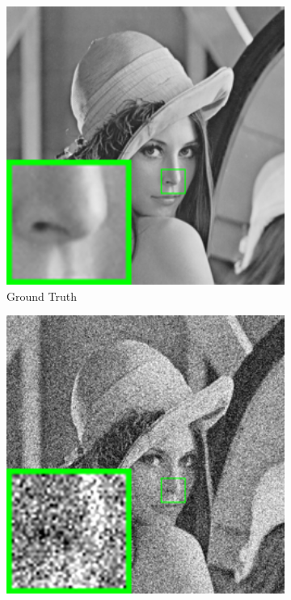 \begin{figure}
\begin{adjustwidth}{-2cm}{}
    \centering
    \begin{subfigure}[t]{0.19\textwidth}
        \centering
        \includegraphics[width=1\textwidth]{images/twsc/awgn/resize_br_lena.png}
	   \caption{Ground Truth}
    \end{subfigure}
    \hfill
    \begin{subfigure}[t]{0.19\textwidth}
        \centering
        \includegraphics[width=1\textwidth]{images/twsc/awgn/resize_br_60_lena.png}

\end{subfigure}
\end{adjustwidth}
\end{figure}
